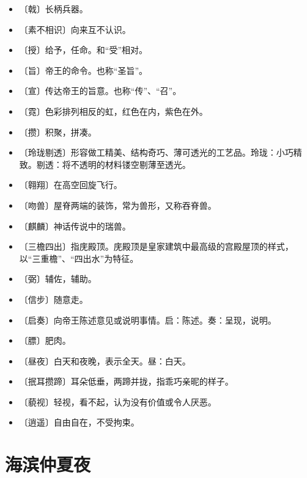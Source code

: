 \documentclass[12pt,UTF-8,openany]{ctexbook}
\begin{document}
\begin{itemize}
    \setlength\itemsep{-0.2em}
    \item 〔戟〕长柄兵器。
    \item 〔素不相识〕向来互不认识。
    \item 〔授〕给予，任命。和“受”相对。
    \item 〔旨〕帝王的命令。也称“圣旨”。
    \item 〔宣〕传达帝王的旨意。也称“传”、“召”。
    \item 〔霓〕色彩排列相反的虹，红色在内，紫色在外。
    \item 〔攒〕积聚，拼凑。
    \item 〔玲珑剔透〕形容做工精美、结构奇巧、薄可透光的工艺品。玲珑：小巧精致。剔透：将不透明的材料镂空剔薄至透光。
    \item 〔翱翔〕在高空回旋飞行。
    \item 〔吻兽〕屋脊两端的装饰，常为兽形，又称吞脊兽。
    \item 〔麒麟〕神话传说中的瑞兽。
    \item 〔三檐四出〕指庑殿顶。庑殿顶是皇家建筑中最高级的宫殿屋顶的样式，以“三重檐”、“四出水”为特征。
    \item 〔弼〕辅佐，辅助。
    \item 〔信步〕随意走。
    \item 〔启奏〕向帝王陈述意见或说明事情。启：陈述。奏：呈现，说明。
    \item 〔膘〕肥肉。
    \item 〔昼夜〕白天和夜晚，表示全天。昼：白天。
    \item 〔抿耳攒蹄〕耳朵低垂，两蹄并拢，指乖巧亲昵的样子。
    \item 〔藐视〕轻视，看不起，认为没有价值或令人厌恶。
    \item 〔逍遥〕自由自在，不受拘束。
\end{itemize}

\chapter{海滨仲夏夜}
\end{document}
